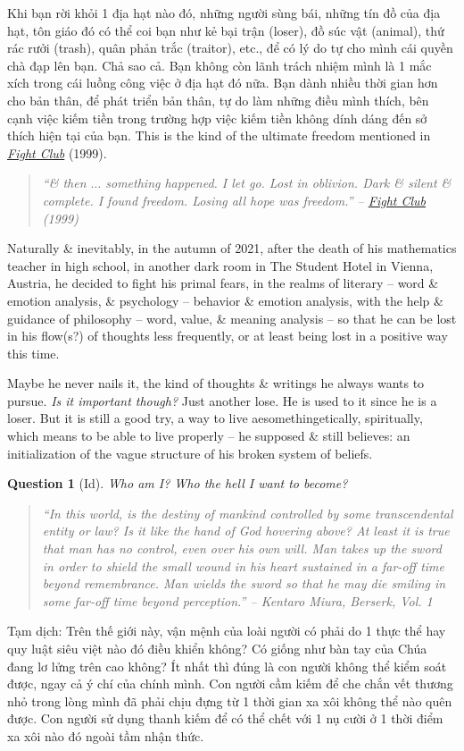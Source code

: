 \documentclass[12pt,twoside]{book}
\newtheorem{question}{Question}
\begin{document}
Khi bạn rời khỏi 1 địa hạt nào đó, những người sùng bái, những tín đồ của địa hạt, tôn giáo đó có thể coi bạn như kẻ bại trận (loser), đồ súc vật (animal), thứ rác rưởi (trash), quân phản trắc (traitor), etc., để có lý do tự cho mình cái quyền chà đạp lên bạn. Chả sao cả. Bạn không còn lãnh trách nhiệm mình là 1 mắc xích trong cái luồng công việc ở địa hạt đó nữa. Bạn dành nhiều thời gian hơn cho bản thân, để phát triển bản thân, tự do làm những điều mình thích, bên cạnh việc kiếm tiền trong trường hợp việc kiếm tiền không dính dáng đến sở thích hiện tại của bạn. This is the kind of the ultimate freedom mentioned in \href{https://www.imdb.com/title/tt0137523}{\it Fight Club} (1999).
\begin{quote}\it
	``\& then $\ldots$ something happened. I let go. Lost in oblivion. Dark \& silent \& complete. I found freedom. Losing all hope was freedom.'' -- \href{https://www.imdb.com/title/tt0137523}{\it Fight Club} (1999)
\end{quote}
Naturally \& inevitably, in the autumn of 2021, after the death of his mathematics teacher in high school, in another dark room in The Student Hotel in Vienna, Austria, he decided to fight his primal fears, in the realms of literary -- word \& emotion analysis, \& psychology -- behavior \& emotion analysis, with the help \& guidance of philosophy -- word, value, \& meaning analysis -- so that he can be lost in his flow(s?) of thoughts less frequently, or at least being lost in a positive way this time.

Maybe he never nails it, the kind of thoughts \& writings he always wants to pursue. {\it Is it important though?} Just another lose. He is used to it since he is a loser. But it is still a good try, a way to live aesomethingetically, spiritually, which means to be able to live properly -- he supposed \& still believes: an initialization of the vague structure of his broken system of beliefs.

\begin{question}[Id]
	Who am I? Who the hell I want to become?
\end{question}

\begin{quotation}\it
	``In this world, is the destiny of mankind controlled by some transcendental entity or law? Is it like the hand of God hovering above? At least it is true that man has no control, even over his own will. Man takes up the sword in order to shield the small wound in his heart sustained in a far-off time beyond remembrance. Man wields the sword so that he may die smiling in some far-off time beyond perception.'' -- {\sc Kentaro Miura}, {\it Berserk}, Vol. 1
\end{quotation}
{\sf Tạm dịch}: Trên thế giới này, vận mệnh của loài người có phải do 1 thực thể hay quy luật siêu việt nào đó điều khiển không? Có giống như bàn tay của Chúa đang lơ lửng trên cao không? Ít nhất thì đúng là con người không thể kiểm soát được, ngay cả ý chí của chính mình. Con người cầm kiếm để che chắn vết thương nhỏ trong lòng mình đã phải chịu đựng từ 1 thời gian xa xôi không thể nào quên được. Con người sử dụng thanh kiếm để có thể chết với 1 nụ cười ở 1 thời điểm xa xôi nào đó ngoài tầm nhận thức.
\end{document}
